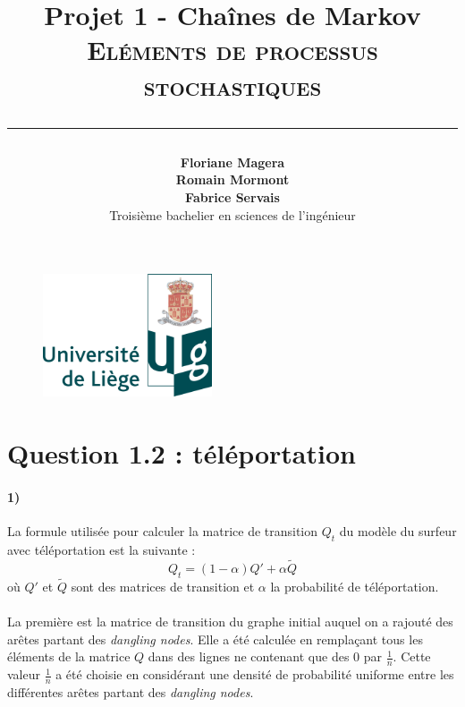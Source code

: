 \documentclass[a4paper,titlepage]{report}
\begin{document}
\begin{titlepage}

\begin{figure}
\centering
\includegraphics[width=5cm]{logo-ulg.png}
\end{figure}



\title{
\vspace{0.2cm}
\LARGE{\textbf{Projet 1 - Chaînes de Markov}} \\ \textsc{Eléments de processus stochastiques}
\author{\textbf{Floriane Magera} \\ \textbf{Romain Mormont} \\ \textbf{Fabrice Servais}\\ Troisième bachelier en sciences de l'ingénieur}
\date{}
\rule{15cm}{1.5pt}
}

\end{titlepage}

\pagestyle{fancy}

\maketitle

\newpage
\section{Question 1.2 : téléportation}
\paragraph{1)}
La formule utilisée pour calculer la matrice de transition $Q_t$ du modèle du surfeur avec téléportation est la suivante :
\[
	Q_t = (1 - \alpha) Q' + \alpha \tilde{Q}
\]
où $Q'$ et $\tilde{Q}$ sont des matrices de transition et $\alpha$ la probabilité de téléportation. 
\paragraph{}
La première est la matrice de transition du graphe initial auquel on a rajouté des arêtes partant des \textit{dangling nodes}. Elle a été calculée en remplaçant tous les éléments de la matrice $Q$ dans des lignes ne contenant que des 0 par $\frac{1}{n}$. Cette valeur $\frac{1}{n}$ a été choisie en considérant une densité de probabilité uniforme entre les différentes arêtes partant des \textit{dangling nodes}. 
\end{document}
